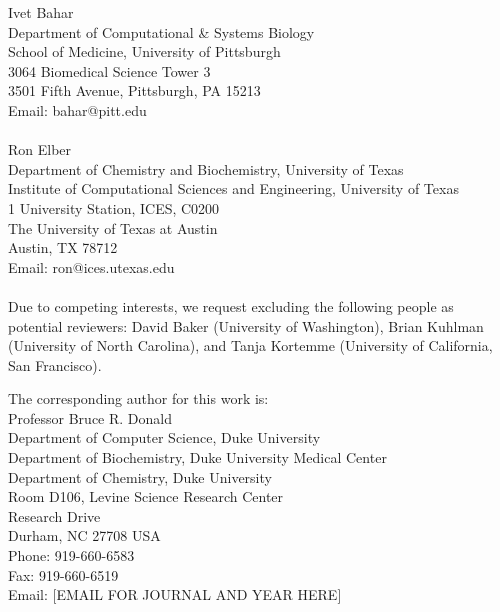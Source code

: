 \documentclass[11pt, oneside]{article}   	%
\begin{document}
\hspace{-0.285in} Ivet Bahar \\
Department of Computational \& Systems Biology \\
School of Medicine, University of Pittsburgh \\
3064 Biomedical Science Tower 3 \\
3501 Fifth Avenue, Pittsburgh, PA 15213 \\
Email: bahar@pitt.edu \\
  \\

\hspace{-0.285in} Ron Elber \\
Department of Chemistry and Biochemistry, University of Texas \\
Institute of Computational Sciences and Engineering, University of Texas \\
1 University Station, ICES, C0200 \\
The University of Texas at Austin \\
Austin, TX 78712 \\
Email: ron@ices.utexas.edu \\
   \\

Due to competing interests, we request excluding the following people as potential reviewers: David Baker (University of Washington), Brian Kuhlman (University of North Carolina), and Tanja Kortemme (University of California, San Francisco).  

The corresponding author for this work is:
    \\

\hspace{-0.285in} Professor Bruce R. Donald \\
Department of Computer Science, Duke University \\
Department of Biochemistry, Duke University Medical Center  \\
Department of Chemistry, Duke University \\
Room D106, Levine Science Research Center \\
Research Drive \\
Durham, NC 27708 USA \\
Phone: 919-660-6583 \\
Fax: 919-660-6519 \\
Email: [EMAIL FOR JOURNAL AND YEAR HERE] \\
\end{document}
